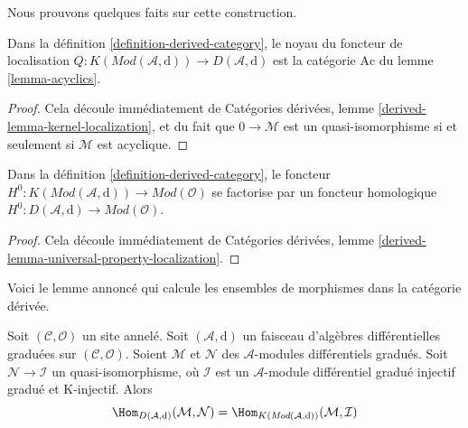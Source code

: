 \noindent
Nous prouvons quelques faits sur cette construction.

\begin{lemma}
\label{lemma-kernel-localization}
Dans la définition \ref{definition-derived-category},
le noyau du foncteur de localisation
$Q : K(\textit{Mod}(\mathcal{A}, \text{d})) \to D(\mathcal{A}, \text{d})$
est la catégorie $\text{Ac}$ du lemme \ref{lemma-acyclics}.
\end{lemma}

\begin{proof}
Cela découle immédiatement
de Catégories dérivées, lemme \ref{derived-lemma-kernel-localization},
et du fait que $0 \to \mathcal{M}$ est un quasi-isomorphisme si
et seulement si $\mathcal{M}$ est acyclique.
\end{proof}

\begin{lemma}
\label{lemma-H0-over-D}
Dans la définition \ref{definition-derived-category}, le foncteur
$H^0 : K(\textit{Mod}(\mathcal{A}, \text{d})) \to
\textit{Mod}(\mathcal{O})$ se factorise par un foncteur homologique
$H^0 : D(\mathcal{A}, \text{d}) \to \textit{Mod}(\mathcal{O})$.
\end{lemma}

\begin{proof}
Cela découle immédiatement
de Catégories dérivées, lemme \ref{derived-lemma-universal-property-localization}.
\end{proof}

\noindent
Voici le lemme annoncé qui calcule les ensembles de morphismes dans la
catégorie dérivée.

\begin{lemma}
\label{lemma-hom-derived}
Soit $(\mathcal{C}, \mathcal{O})$ un site annelé. Soit
$(\mathcal{A}, \text{d})$ un faisceau d'algèbres différentielles graduées
sur $(\mathcal{C}, \mathcal{O})$.
Soient $\mathcal{M}$ et $\mathcal{N}$ des
$\mathcal{A}$-modules différentiels gradués. Soit $\mathcal{N} \to \mathcal{I}$
un quasi-isomorphisme, où $\mathcal{I}$ est un
$\mathcal{A}$-module différentiel gradué injectif gradué et K-injectif. Alors
$$
\Hom_{D(\mathcal{A}, \text{d})}(\mathcal{M}, \mathcal{N}) =
\Hom_{K(\textit{Mod}(\mathcal{A}, \text{d}))}(\mathcal{M}, \mathcal{I})
$$
\end{lemma}

